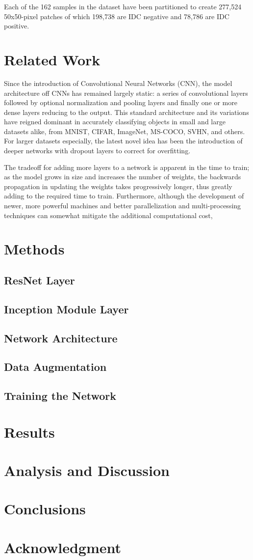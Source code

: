 \documentclass[conference]{IEEEtran}
\begin{document}
Each of the 162 samples in the dataset have been partitioned to create 277,524 50x50-pixel patches of which 198,738 are IDC negative and 78,786 are IDC positive. 

\section{Related Work}
Since the introduction of Convolutional Neural Networks (CNN), the model architecture off CNNs has remained largely static: a series of convolutional layers followed by optional normalization and pooling layers and finally one or more dense layers reducing to the output. This standard architecture and its variations have reigned dominant in accurately classifying objects in small and large datasets alike, from MNIST, CIFAR, ImageNet, MS-COCO, SVHN, and others. For larger datasets especially, the latest novel idea has been the introduction of deeper networks with dropout layers to correct for overfitting.

The tradeoff for adding more layers to a network is apparent in the time to train; as the model grows in size and increases the number of weights, the backwards propagation in updating the weights takes progressively longer, thus greatly adding to the required time to train. Furthermore, although the development of newer, more powerful machines and better parallelization and multi-processing techniques can somewhat mitigate the additional computational cost, 

\section{Methods}
\subsection{ResNet Layer}
\subsection{Inception Module Layer}
\subsection{Network Architecture}
\subsection{Data Augmentation}
\subsection{Training the Network}

\section{Results}

\section{Analysis and Discussion}

\section{Conclusions}

\section*{Acknowledgment}


\end{document}
